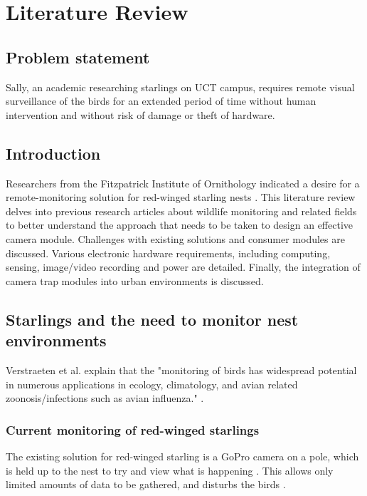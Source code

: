 \documentclass[class=report,11pt,crop=false]{standalone}
\begin{document}
\ifstandalone
\tableofcontents
\fi
\chapter{Literature Review \label{ch:literature}}
\section{Problem statement}

Sally, an academic researching starlings on UCT campus, requires remote visual surveillance of the birds for an extended period of time without human intervention and without risk of damage or theft of hardware.

\section{Introduction}

Researchers from the Fitzpatrick Institute of Ornithology indicated a desire for a remote-monitoring solution for red-winged starling nests \cite{hofmeyer2024private}. This literature review delves into previous research articles about wildlife monitoring and related fields to better understand the approach that needs to be taken to design an effective camera module. Challenges with existing solutions and consumer modules are discussed. Various electronic hardware requirements, including computing, sensing, image/video recording and power are detailed. Finally, the integration of camera trap modules into urban environments is discussed.

\section{Starlings and the need to monitor nest environments}

Verstraeten et al. explain that the "monitoring of birds has widespread potential in numerous applications in ecology, climatology, and avian related zoonosis/infections such as avian influenza." \cite{verstraeten2010webcams}.

\subsection{Current monitoring of red-winged starlings}

The existing solution for red-winged starling is a GoPro camera on a pole, which is held up to the nest to try and view what is happening \cite{hofmeyer2024private}. This allows only limited amounts of data to be gathered, and disturbs the birds \cite{hofmeyer2024private}.
\end{document}
